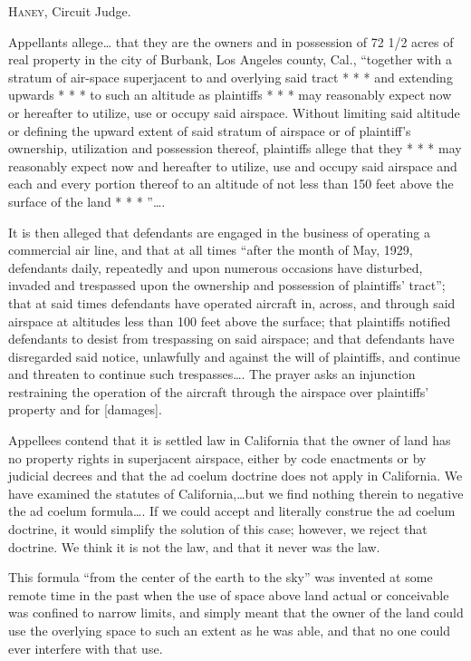 

\opinion \textsc{Haney}, Circuit Judge.

Appellants allege{\dots} that they are the owners and in possession of 72 1/2
acres of real property in the city of Burbank, Los Angeles county, Cal.,
``together with a stratum of air-space superjacent to and overlying said tract
* * * and extending upwards * * * to such an altitude as plaintiffs * * * may
reasonably expect now or hereafter to utilize, use or occupy said airspace.
Without limiting said altitude or defining the upward extent of said stratum of
airspace or of plaintiff's ownership, utilization and possession thereof,
plaintiffs allege that they * * * may reasonably expect now and hereafter to
utilize, use and occupy said airspace and each and every portion thereof to an
altitude of not less than 150 feet above the surface of the land * * * ''\dots.

It is then alleged that defendants are engaged in the business of operating a
commercial air line, and that at all times ``after the month of May, 1929,
defendants daily, repeatedly and upon numerous occasions have disturbed,
invaded and trespassed upon the ownership and possession of plaintiffs'
tract''; that at said times defendants have operated aircraft in, across, and
through said airspace at altitudes less than 100 feet above the surface; that
plaintiffs notified defendants to desist from trespassing on said airspace; and
that defendants have disregarded said notice, unlawfully and against the will
of plaintiffs, and continue and threaten to continue such trespasses\dots. 
The prayer asks an injunction restraining the operation of the aircraft through
the airspace over plaintiffs' property and for [damages].

Appellees contend that it is settled law in California that the owner of land
has no property rights in superjacent airspace, either by code enactments or by
judicial decrees and that the ad coelum doctrine does not apply in California.
We have examined the statutes of California,\dots but we find nothing therein
to negative the ad coelum formula\dots. If we could accept and literally
construe the ad coelum doctrine, it would simplify the solution of this case;
however, we reject that doctrine. We think it is not the law, and that it never
was the law.

This formula ``from the center of the earth to the sky'' was invented at some
remote time in the past when the use of space above land actual or conceivable
was confined to narrow limits, and simply meant that the owner of the land
could use the overlying space to such an extent as he was able, and that no one
could ever interfere with that use.

